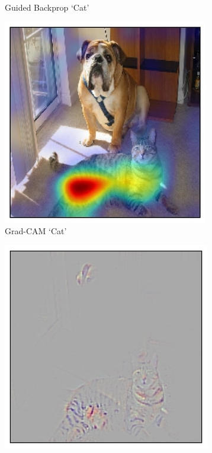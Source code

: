 \begin{figure}[t!]
\begin{subfigure}[t]{0.161\textwidth}
        \caption{\scriptsize{Guided Backprop `Cat'}}
        \label{fig:teaser_gb_cat}
	\end{subfigure}
	\begin{subfigure}[t]{0.161\textwidth}
		\centering
		\includegraphics[width=\textwidth]{figures/teaser/newgcam_heatmap_overlaid_283_cat_dog_with_margin_small.jpg}
        \caption{\scriptsize{Grad-CAM `Cat'}}
        \label{fig:teaser_gcam_cat}
	\end{subfigure}
	\begin{subfigure}[t]{0.161\textwidth}
		\centering
		\includegraphics[width=0.995\textwidth]{figures/teaser/gbgcam_cat_margin.jpg}

\end{subfigure}
\end{figure}
